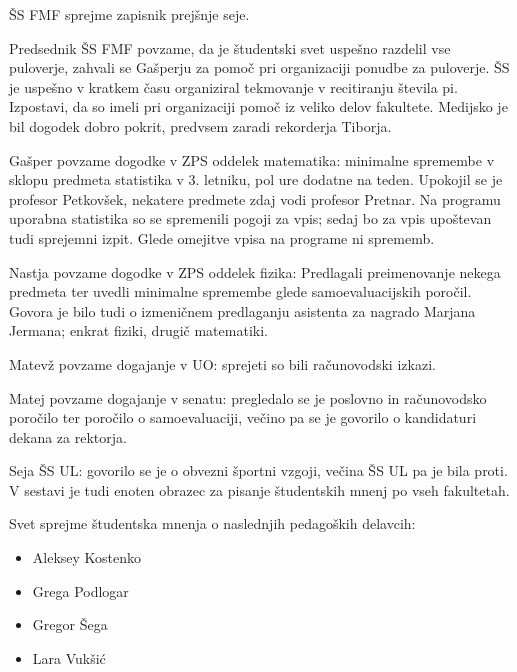 \documentclass{seja}
\begin{document}
\begin{ad}
    \item
    \begin{sklep*}
        ŠS FMF sprejme zapisnik prejšnje seje.
    \end{sklep*}
    
    \item
    Predsednik ŠS FMF povzame, da je študentski svet uspešno razdelil vse puloverje, zahvali se Gašperju za pomoč pri organizaciji ponudbe za puloverje. ŠS je uspešno v kratkem času organiziral tekmovanje v recitiranju števila pi. Izpostavi, da so imeli pri organizaciji pomoč iz veliko delov fakultete. Medijsko je bil dogodek dobro pokrit, predvsem zaradi rekorderja Tiborja.
   
    \item
    Gašper povzame dogodke v ZPS oddelek matematika: minimalne spremembe v sklopu predmeta statistika v 3. letniku, pol ure dodatne na teden. Upokojil se je profesor Petkovšek, nekatere predmete zdaj vodi profesor Pretnar. Na programu uporabna statistika so se spremenili pogoji za vpis; sedaj bo za vpis upoštevan tudi sprejemni izpit. Glede omejitve vpisa na programe ni sprememb.
   
    Nastja povzame dogodke v ZPS oddelek fizika: Predlagali preimenovanje nekega predmeta ter uvedli minimalne spremembe glede samoevaluacijskih poročil. Govora je bilo tudi o izmeničnem predlaganju asistenta za nagrado Marjana Jermana; enkrat fiziki, drugič matematiki.
   
    Matevž povzame dogajanje v UO: sprejeti so bili računovodski izkazi.
  
    Matej povzame dogajanje v senatu: pregledalo se je poslovno in računovodsko poročilo ter poročilo o samoevaluaciji, večino pa se je govorilo o kandidaturi dekana za rektorja.

    Seja ŠS UL: govorilo se je o obvezni športni vzgoji, večina ŠS UL pa je bila proti. V sestavi je tudi enoten obrazec za pisanje študentskih mnenj po vseh fakultetah.
 
    \item
    \begin{sklep*}
        Svet sprejme študentska mnenja o naslednjih pedagoških delavcih:
        \begin{itemize}
            \item Aleksey Kostenko
            \item Grega Podlogar
            \item Gregor Šega
            \item Lara Vukšić
        \end{itemize}
            

\end{sklep*}
\end{ad}
\end{document}
